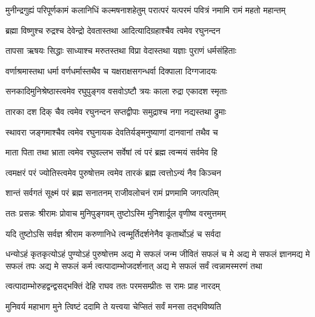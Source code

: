 \fourlineindentedshloka
{मुनीन्द्रगुह्यं परिपूर्णकामं}
{कलानिधिं कल्मषनाशहेतुम्}
{परात्परं यत्परमं पवित्रं}
{नमामि रामं महतो महान्तम्}%

\twolineshloka
{ब्रह्मा विष्णुश्च रुद्रश्च देवेन्द्रो देवतास्तथा}
{आदित्यादिग्रहाश्चैव त्वमेव रघुनन्दन}%

\twolineshloka
{तापसा ऋषयः सिद्धाः साध्याश्च मरुतस्तथा}
{विप्रा वेदास्तथा यज्ञाः पुराणं धर्मसंहिताः}%

\twolineshloka
{वर्णाश्रमास्तथा धर्मा वर्णधर्मास्तथैव च}
{यक्षराक्षसगन्धर्वा दिक्पाला दिग्गजादयः}%

\twolineshloka
{सनकादिमुनिश्रेष्ठास्त्वमेव रघुपुङ्गव}
{वसवोऽष्टौ त्रयः काला रुद्रा एकादश स्मृताः}%

\twolineshloka
{तारका दश दिक् चैव त्वमेव रघुनन्दन}
{सप्तद्वीपाः समुद्राश्च नगा नद्यस्तथा द्रुमाः}%

\twolineshloka
{स्थावरा जङ्गमाश्चैव त्वमेव रघुनायक}
{देवतिर्यङ्मनुष्याणां दानवानां तथैव च}%

\twolineshloka
{माता पिता तथा भ्राता त्वमेव रघुवल्लभ}
{सर्वेषां त्वं परं ब्रह्म त्वन्मयं सर्वमेव हि}%

\twolineshloka
{त्वमक्षरं परं ज्योतिस्त्वमेव पुरुषोत्तम}
{त्वमेव तारकं ब्रह्म त्वत्तोऽन्यं नैव किञ्चन}%

\twolineshloka
{शान्तं सर्वगतं सूक्ष्मं परं ब्रह्म सनातनम्}
{राजीवलोचनं रामं प्रणमामि जगत्पतिम्}%


\twolineshloka
{ततः प्रसन्नः श्रीरामः प्रोवाच मुनिपुङ्गवम्}
{तुष्टोऽस्मि मुनिशार्दूल वृणीष्व वरमुत्तमम्}%


\twolineshloka
{यदि तुष्टोऽसि सर्वज्ञ श्रीराम करुणानिधे}
{त्वन्मूर्तिदर्शनेनैव कृतार्थोऽहं च सर्वदा}%

\threelineshloka
{धन्योऽहं कृतकृत्योऽहं पुण्योऽहं पुरुषोत्तम}
{अद्य मे सफलं जन्म जीवितं सफलं च मे}%
{अद्य मे सफलं ज्ञानमद्य मे सफलं तपः}
\twolineshloka
{अद्य मे सफलं कर्म त्वत्पादाम्भोजदर्शनात्}
{अद्य मे सफलं सर्वं त्वन्नामस्मरणं तथा}%

\twolineshloka
{त्वत्पादाम्भोरुहद्वन्द्वसद्भक्तिं देहि राघव}
{ततः परमसम्प्रीतः स रामः प्राह नारदम्}%


\twolineshloka
{मुनिवर्य महाभाग मुने त्विष्टं ददामि ते}
{यत्त्वया चेप्सितं सर्वं मनसा तद्भविष्यति}%



